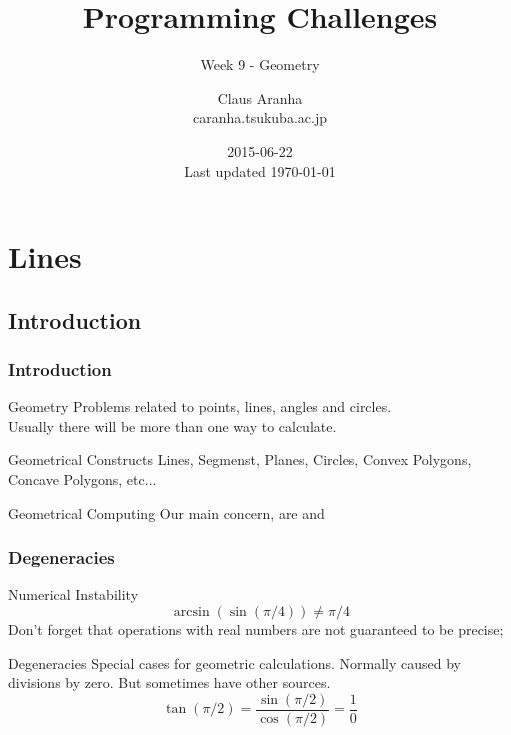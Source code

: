 \documentclass{beamer}
\title[]{Programming Challenges}
\subtitle[]{Week 9 - Geometry}
\author[Claus Aranha]{Claus Aranha\\{\footnotesize caranha\@@cs.tsukuba.ac.jp}}
\institute{College of Information Sciences}
\date{2015-06-22\\{\tiny Last updated \today}}
\begin{document}
\begin{frame}
\maketitle
\end{frame}


\section{Lines}
\subsection{Introduction}

\begin{frame}
  \frametitle{Introduction}
  \begin{block}{Geometry}
    Problems related to points, lines, angles and circles.\\ Usually
    there will be more than one way to calculate.
  \end{block}

  \begin{block}{Geometrical Constructs}
    Lines, Segmenst, Planes, Circles, Convex Polygons, Concave Polygons, etc...
  \end{block}
  
  \begin{block}{Geometrical Computing}
    Our main concern, are  and
  \end{block}
\end{frame}

\begin{frame}
  \frametitle{Degeneracies}
  \begin{block}{Numerical Instability}
    \begin{equation*}
      \arcsin{(\sin{(\pi/4)})} \neq \pi/4 
    \end{equation*}
    Don't forget that operations with real numbers are not guaranteed
    to be precise;
  \end{block}

  \begin{block}{Degeneracies}
    Special cases for geometric calculations. Normally caused by
    divisions by zero. But sometimes have other sources.
    \begin{equation*}
      \tan{(\pi/2)} = \frac{\sin{(\pi/2)}}{\cos{(\pi/2)}} = \frac{1}{0}
    \end{equation*}
  \end{block}
\end{frame}
\end{document}
